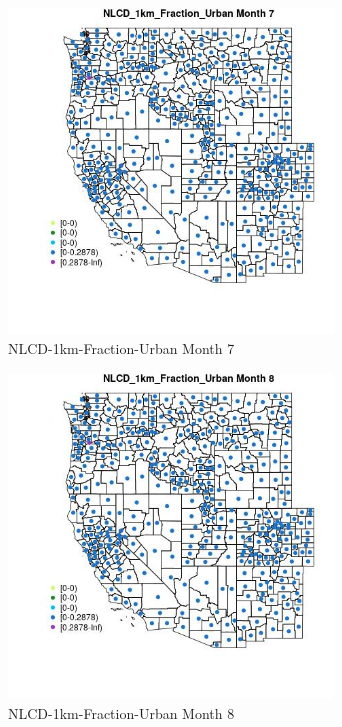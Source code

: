\begin{figure} 
\centering  
\includegraphics[width=0.77\textwidth]{Code_Outputs/df_report_ML_predictors_CountyCentroid_Locations_Dates_2008-01-01to2018-12-31_MapObsMo7NLCD_1km_Fraction_Urban.jpg} 
\caption{\label{fig:df_report_ML_predictors_CountyCentroid_Locations_Dates_2008-01-01to2018-12-31MapObsMo7NLCD_1km_Fraction_Urban}NLCD-1km-Fraction-Urban Month 7} 
\end{figure} 
 

\begin{figure} 
\centering  
\includegraphics[width=0.77\textwidth]{Code_Outputs/df_report_ML_predictors_CountyCentroid_Locations_Dates_2008-01-01to2018-12-31_MapObsMo8NLCD_1km_Fraction_Urban.jpg} 
\caption{\label{fig:df_report_ML_predictors_CountyCentroid_Locations_Dates_2008-01-01to2018-12-31MapObsMo8NLCD_1km_Fraction_Urban}NLCD-1km-Fraction-Urban Month 8} 
\end{figure} 
 

